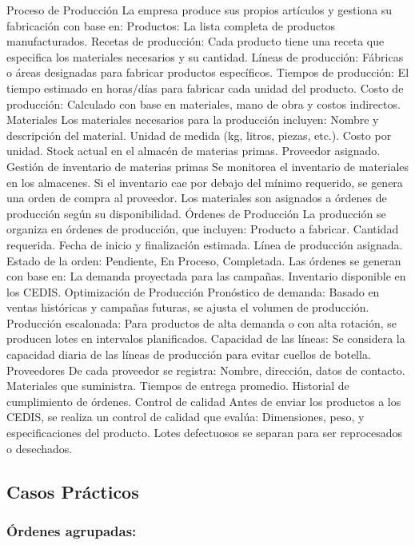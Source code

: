 \documentclass[
  letterpaper,
  DIV=11,
  numbers=noendperiod]{scrreprt}
\begin{document}
Proceso de Producción La empresa produce sus propios artículos y
gestiona su fabricación con base en: Productos: La lista completa de
productos manufacturados. Recetas de producción: Cada producto tiene una
receta que especifica los materiales necesarios y su cantidad. Líneas de
producción: Fábricas o áreas designadas para fabricar productos
específicos. Tiempos de producción: El tiempo estimado en horas/días
para fabricar cada unidad del producto. Costo de producción: Calculado
con base en materiales, mano de obra y costos indirectos. Materiales Los
materiales necesarios para la producción incluyen: Nombre y descripción
del material. Unidad de medida (kg, litros, piezas, etc.). Costo por
unidad. Stock actual en el almacén de materias primas. Proveedor
asignado. Gestión de inventario de materias primas Se monitorea el
inventario de materiales en los almacenes. Si el inventario cae por
debajo del mínimo requerido, se genera una orden de compra al proveedor.
Los materiales son asignados a órdenes de producción según su
disponibilidad. Órdenes de Producción La producción se organiza en
órdenes de producción, que incluyen: Producto a fabricar. Cantidad
requerida. Fecha de inicio y finalización estimada. Línea de producción
asignada. Estado de la orden: Pendiente, En Proceso, Completada. Las
órdenes se generan con base en: La demanda proyectada para las campañas.
Inventario disponible en los CEDIS. Optimización de Producción
Pronóstico de demanda: Basado en ventas históricas y campañas futuras,
se ajusta el volumen de producción. Producción escalonada: Para
productos de alta demanda o con alta rotación, se producen lotes en
intervalos planificados. Capacidad de las líneas: Se considera la
capacidad diaria de las líneas de producción para evitar cuellos de
botella. Proveedores De cada proveedor se registra: Nombre, dirección,
datos de contacto. Materiales que suministra. Tiempos de entrega
promedio. Historial de cumplimiento de órdenes. Control de calidad Antes
de enviar los productos a los CEDIS, se realiza un control de calidad
que evalúa: Dimensiones, peso, y especificaciones del producto. Lotes
defectuosos se separan para ser reprocesados o desechados.

\subsection{Casos Prácticos}\label{casos-pruxe1cticos}

\subsubsection{Órdenes agrupadas:}\label{uxf3rdenes-agrupadas}
\end{document}
